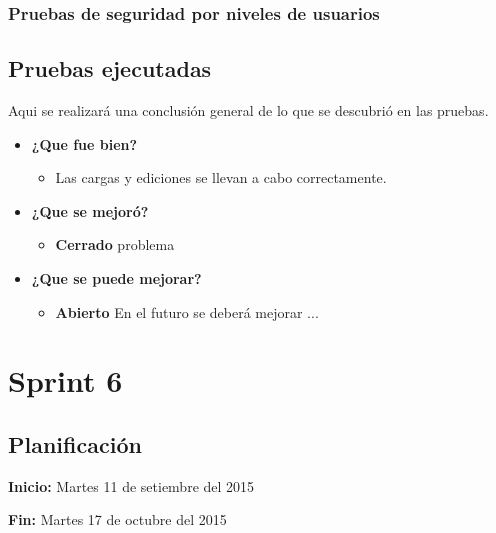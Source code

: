 \documentclass[a4paper,12pt]{article}
\begin{document}
\subsubsection{Pruebas de seguridad por niveles de usuarios}


\subsection{Pruebas ejecutadas}
Aqui se realizará una conclusión general de lo que se descubrió en las pruebas.
	\begin{itemize}
		\item \textbf{¿Que fue bien?}
        	\begin{itemize}
				\item        Las cargas y ediciones se llevan a cabo correctamente.
			\end{itemize}

   		\item \textbf{¿Que se mejoró?}
        	\begin{itemize}
                \item \textbf{Cerrado} problema
			\end{itemize}

   		\item \textbf{¿Que se puede mejorar?}
        	\begin{itemize}
		        \item \textbf{Abierto} En el futuro se deberá mejorar ...
            \end{itemize}
        

	\end{itemize}





\section{Sprint 6} %
\subsection{Planificación}

\textbf{Inicio: }Martes 11 de setiembre del 2015 

\textbf{Fin:} Martes 17 de octubre del 2015
\end{document}

